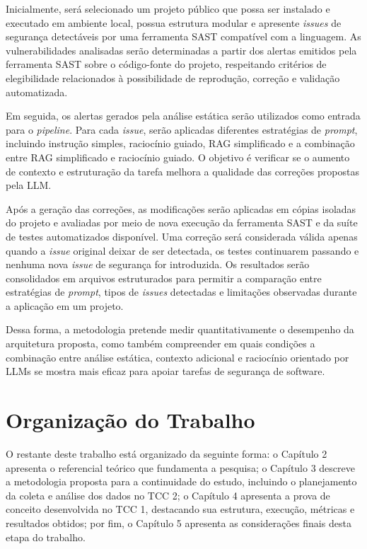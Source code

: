 Inicialmente, será selecionado um projeto público que possa ser instalado e executado em ambiente local, possua estrutura modular e apresente \textit{issues} de segurança detectáveis por uma ferramenta SAST compatível com a linguagem. As vulnerabilidades analisadas serão determinadas a partir dos alertas emitidos pela ferramenta SAST sobre o código-fonte do projeto, respeitando critérios de elegibilidade relacionados à possibilidade de reprodução, correção e validação automatizada.

Em seguida, os alertas gerados pela análise estática serão utilizados como entrada para o \textit{pipeline}. Para cada \textit{issue}, serão aplicadas diferentes estratégias de \textit{prompt}, incluindo instrução simples, raciocínio guiado, RAG simplificado e a combinação entre RAG simplificado e raciocínio guiado. O objetivo é verificar se o aumento de contexto e estruturação da tarefa melhora a qualidade das correções propostas pela LLM.

Após a geração das correções, as modificações serão aplicadas em cópias isoladas do projeto e avaliadas por meio de nova execução da ferramenta SAST e da suíte de testes automatizados disponível. Uma correção será considerada válida apenas quando a \textit{issue} original deixar de ser detectada, os testes continuarem passando e nenhuma nova \textit{issue} de segurança for introduzida. Os resultados serão consolidados em arquivos estruturados para permitir a comparação entre estratégias de \textit{prompt}, tipos de \textit{issues} detectadas e limitações observadas durante a aplicação em um projeto.

Dessa forma, a metodologia pretende medir quantitativamente o desempenho da arquitetura proposta, como também compreender em quais condições a combinação entre análise estática, contexto adicional e raciocínio orientado por LLMs se mostra mais eficaz para apoiar tarefas de segurança de software.

\section{Organização do Trabalho}

O restante deste trabalho está organizado da seguinte forma: o Capítulo 2 apresenta o referencial teórico que fundamenta a pesquisa; o Capítulo 3 descreve a metodologia proposta para a continuidade do estudo, incluindo o planejamento da coleta e análise dos dados no TCC 2; o Capítulo 4 apresenta a prova de conceito desenvolvida no TCC 1, destacando sua estrutura, execução, métricas e resultados obtidos; por fim, o Capítulo 5 apresenta as considerações finais desta etapa do trabalho.


